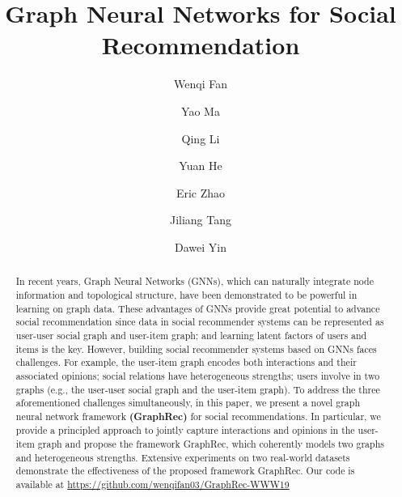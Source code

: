 \documentclass[sigconf]{acmart} \copyrightyear{2019}
\begin{document}
\title{Graph Neural Networks for Social Recommendation}


\author{Wenqi Fan}

\author{Yao Ma}

\author{Qing Li}

\author{Yuan He}

\author{Eric Zhao}

\author{Jiliang Tang}

\author{Dawei Yin}

\begin{abstract}
In recent years, Graph Neural Networks (GNNs), which can naturally integrate node information and topological structure, have been demonstrated to be powerful in learning on graph data. These advantages of GNNs provide great potential to advance social recommendation since data in social recommender systems can be represented as user-user social graph and user-item graph; and learning latent factors of users and items is the key. However, building social recommender systems based on GNNs faces challenges. For example, the user-item graph encodes both interactions and their associated opinions; social relations have heterogeneous strengths; users involve in two graphs (e.g., the user-user social graph and the user-item graph). To address the three aforementioned challenges simultaneously, in this paper, we present a novel graph neural network framework \textbf{(GraphRec)} for social recommendations. In particular, we provide a principled approach to jointly capture interactions and opinions in the user-item graph and propose the framework GraphRec, which coherently models two graphs and heterogeneous strengths. Extensive experiments on two real-world datasets demonstrate the effectiveness of the proposed framework GraphRec. Our code is available at \url{https://github.com/wenqifan03/GraphRec-WWW19}
\end{abstract}
\end{document}
